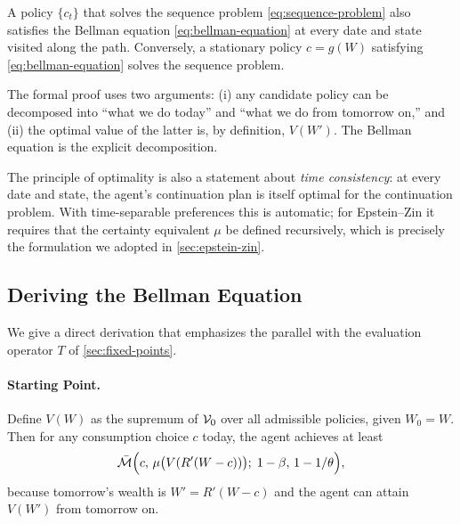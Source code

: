 \begin{proposition}
\label{prop:principle-optimality}
A policy $\{c_t\}$ that solves the sequence problem \cref{eq:sequence-problem} also satisfies the Bellman equation \cref{eq:bellman-equation} at every date and state visited along the path. Conversely, a stationary policy $c = g(W)$ satisfying \cref{eq:bellman-equation} solves the sequence problem.
\end{proposition}

The formal proof uses two arguments: (i) any candidate policy can be decomposed into ``what we do today'' and ``what we do from tomorrow on,'' and (ii) the optimal value of the latter is, by definition, $V(W')$. The Bellman equation is the explicit decomposition.

\begin{calloutnote}
The principle of optimality is also a statement about \emph{time consistency}: at every date and state, the agent's continuation plan is itself optimal for the continuation problem. With time-separable preferences this is automatic; for Epstein--Zin it requires that the certainty equivalent $\mu$ be defined recursively, which is precisely the formulation we adopted in \cref{sec:epstein-zin}.
\end{calloutnote}

\subsection{Deriving the Bellman Equation}
\label{subsec:dp-deriving-bellman}

We give a direct derivation that emphasizes the parallel with the evaluation operator $T$ of \cref{sec:fixed-points}.

\paragraph{Starting Point.}
Define $V(W)$ as the supremum of $\mathcal{V}_0$ over all admissible policies, given $W_0 = W$. Then for any consumption choice $c$ today, the agent achieves at least
\begin{equation}
\bar{\mathcal{M}}\Big( c, \, \mu\big( V(R'(W - c)) \big); \; 1-\beta, \, 1-1/\theta \Big),
\label{eq:value-bound}
\end{equation}
because tomorrow's wealth is $W' = R'(W - c)$ and the agent can attain $V(W')$ from tomorrow on.

